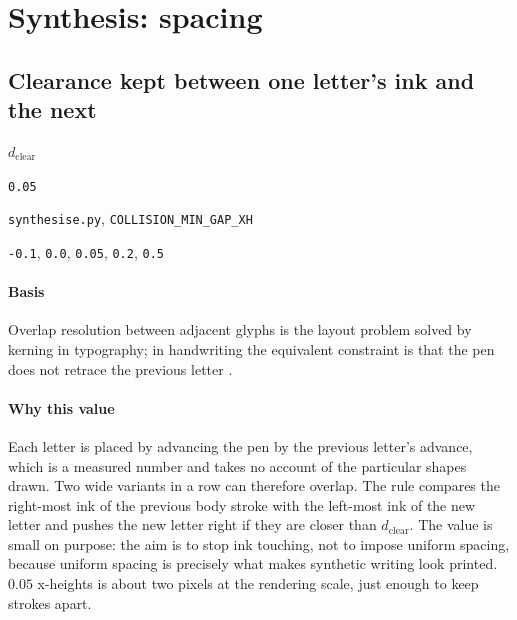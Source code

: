 \section{Synthesis: spacing}

\subsection{Clearance kept between one letter's ink and the next}

\label{coef:collision-gap}

\begin{description}[leftmargin=5.2em,style=sameline]

\item[Symbol] $d_{\text{clear}}$

\item[Value] \texttt{0.05}

\item[Source] \texttt{synthesise.py}, \texttt{COLLISION\_MIN\_GAP\_XH}

\item[Swept] \texttt{-0.1}, \texttt{0.0}, \texttt{0.05}, \texttt{0.2}, \texttt{0.5}

\end{description}

\paragraph{Basis}

Overlap resolution between adjacent glyphs is the layout problem solved by kerning in typography; in handwriting the equivalent constraint is that the pen does not retrace the previous letter \cite{plamondon2000}.

\paragraph{Why this value}

Each letter is placed by advancing the pen by the previous letter's advance, which is a measured number and takes no account of the particular shapes drawn. Two wide variants in a row can therefore overlap. The rule compares the right-most ink of the previous body stroke with the left-most ink of the new letter and pushes the new letter right if they are closer than $d_{\text{clear}}$. The value is small on purpose: the aim is to stop ink touching, not to impose uniform spacing, because uniform spacing is precisely what makes synthetic writing look printed. $0.05$ x-heights is about two pixels at the rendering scale, just enough to keep strokes apart.

